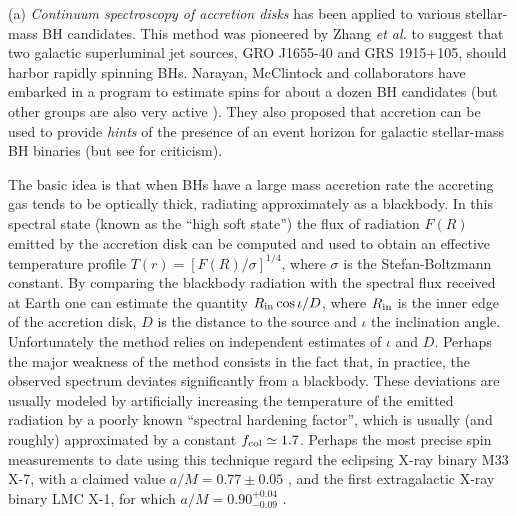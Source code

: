 \documentclass[]{iopart}
\begin{document}
\noindent
(a) {\it Continuum spectroscopy of accretion disks} has been applied to
various stellar-mass BH candidates. This method was pioneered by Zhang {\it et
  al.} \cite{Zhang:1997dy} to suggest that two galactic superluminal jet
sources, GRO J1655-40 and GRS 1915+105, should harbor rapidly spinning
BHs. Narayan, McClintock and collaborators have embarked in a program to
estimate spins for about a dozen BH candidates
\cite{Shafee:2005ef,McClintock:2006xd,Narayan:2007ks,
  Shafee:2007sa,McClintock:2007we,Liu:2008tk,Gou:2009ks} (but other groups are
also very active
\cite{Middleton:2006kj,Davis:2006bk,Davis:2006cm,Brown:2006cj}).
They also proposed that accretion can be used to provide {\it hints} of the
presence of an event horizon for galactic stellar-mass BH binaries
\cite{Psaltis:2008bb,Narayan:2005ie} (but see \cite{Abramowicz:2002vt} for
criticism).

The basic idea is that when BHs have a large mass accretion rate the accreting
gas tends to be optically thick, radiating approximately as a blackbody. In
this spectral state (known as the ``high soft state'') the flux of radiation
$F(R)$ emitted by the accretion disk can be computed \cite{Page:1974he} and
used to obtain an effective temperature profile
$T(r)=\left[F(R)/\sigma\right]^{1/4}$, where $\sigma$ is the Stefan-Boltzmann
constant. By comparing the blackbody radiation with the spectral flux received
at Earth one can estimate the quantity $R_{\rm in}\cos\iota/D$, where $R_{\rm
  in}$ is the inner edge of the accretion disk, $D$ is the distance to the
source and $\iota$ the inclination angle. Unfortunately the method relies on
independent estimates of $\iota$ and $D$. Perhaps the major weakness of the
method consists in the fact that, in practice, the observed spectrum deviates
significantly from a blackbody. These deviations are usually modeled by
artificially increasing the temperature of the emitted radiation by a poorly
known ``spectral hardening factor'', which is usually (and roughly)
approximated by a constant $f_{\rm col}\simeq 1.7$.
%
Perhaps the most precise spin measurements to date using this technique regard
the eclipsing X-ray binary M33 X-7, with a claimed value $a/M=0.77\pm 0.05$
\cite{Liu:2008tk}, and the first extragalactic X-ray binary LMC X-1, for which
$a/M=0.90^{+0.04}_{-0.09}$ \cite{Gou:2009ks}.
\end{document}

